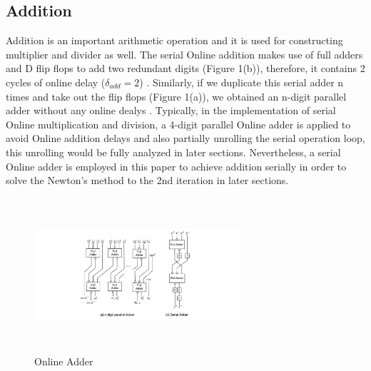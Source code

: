 \documentclass{sig-alternate}
\begin{document}
	\subsection{Addition}	
	Addition is an important arithmetic operation and it is used for constructing multiplier and divider as well. 
	The serial Online addition makes use of full adders and D flip flops to add two redundant digits (Figure 1(b)), therefore, it contains 2 cycles of online delay ($\delta_{add} = 2$) \cite{arithmetic_overview}. 
	Similarly, if we duplicate this serial adder n times and take out the flip flops (Figure 1(a)), we obtained an n-digit parallel adder without any online dealys \cite{Kan_parallel_operators}. 
	Typically, in the implementation of serial Online multiplication and division, a 4-digit parallel Online adder is applied to avoid Online addition delays and also partially unrolling the serial operation loop, this unrolling would be fully analyzed in later sections. 
	Nevertheless, a serial Online adder is employed in this paper to achieve addition serially in order to solve the Newton's method to the 2nd iteration in later sections.   
	\vspace{-8pt}
	\begin{figure} [ht]
		\centering
		\includegraphics[width=3in,height=2.25in]{Adder_2nd}
		\caption{Online Adder}
	\end{figure}
	\vspace{-14pt}
\end{document}
